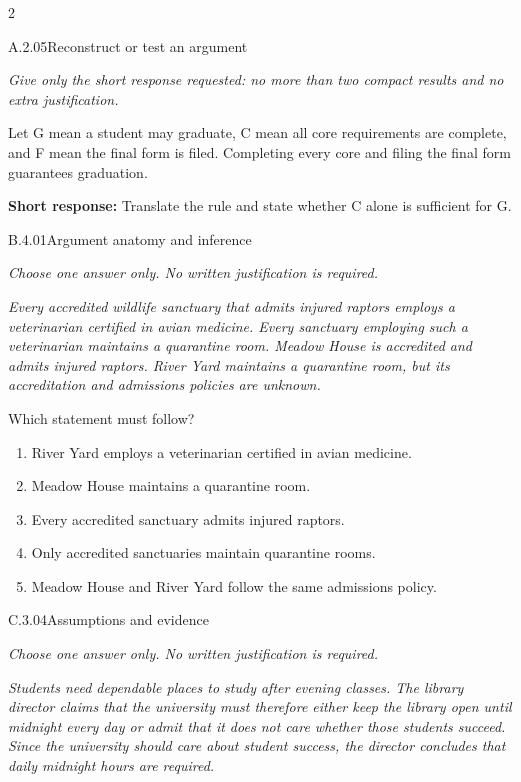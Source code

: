 \documentclass[9pt]{extarticle}
\newcommand{\choice}[1]{\item #1}
\begin{document}
\begin{multicols}{2}
\begin{DenseCoreProblem}{A.2.05}{Reconstruct or test an argument}
{\scriptsize\textit{Give only the short response requested: no more than two compact results and no extra justification.}\par}
Let G mean a student may graduate, C mean all core requirements are complete, and F mean the final form is filed. Completing every core and filing the final form guarantees graduation.

\textbf{Short response:} Translate the rule and state whether C alone is sufficient for G.
\end{DenseCoreProblem}
\begin{DenseCoreProblem}{B.4.01}{Argument anatomy and inference}
{\scriptsize\textit{Choose one answer only. No written justification is required.}\par}
\emph{Every accredited wildlife sanctuary that admits injured raptors employs a veterinarian certified in avian medicine. Every sanctuary employing such a veterinarian maintains a quarantine room. Meadow House is accredited and admits injured raptors. River Yard maintains a quarantine room, but its accreditation and admissions policies are unknown.}

Which statement must follow?
\begin{enumerate}[label=(\alph*)]
  \choice{River Yard employs a veterinarian certified in avian medicine.}
  \choice{Meadow House maintains a quarantine room.}
  \choice{Every accredited sanctuary admits injured raptors.}
  \choice{Only accredited sanctuaries maintain quarantine rooms.}
  \choice{Meadow House and River Yard follow the same admissions policy.}
\end{enumerate}
\end{DenseCoreProblem}
\columnbreak
\begin{DenseCoreProblem}{C.3.04}{Assumptions and evidence}
{\scriptsize\textit{Choose one answer only. No written justification is required.}\par}
\emph{Students need dependable places to study after evening classes. The library director claims that the university must therefore either keep the library open until midnight every day or admit that it does not care whether those students succeed. Since the university should care about student success, the director concludes that daily midnight hours are required.}


\end{DenseCoreProblem}
\end{multicols}
\end{document}
